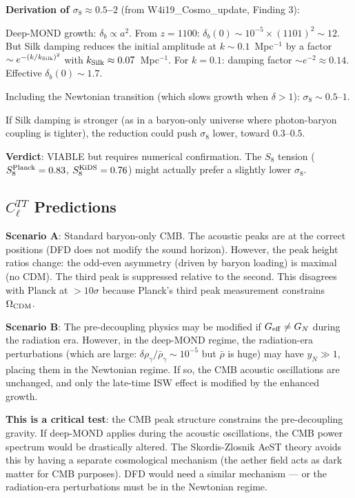 \documentclass[11pt]{article}
\theoremstyle{definition}
\theoremstyle{remark}
\newcommand{\Geff}{G_{\rm eff}}
\begin{document}
\textbf{Derivation of $\sigma_8 \approx 0.5$--$2$} (from
W4i19\_Cosmo\_update, Finding 3):

Deep-MOND growth: $\delta_b \propto a^2$. From $z = 1100$:
$\delta_b(0) \sim 10^{-5} \times (1101)^2 \sim 12$. But Silk
damping reduces the initial amplitude at $k \sim 0.1$~Mpc$^{-1}$
by a factor $\sim e^{-(k/k_{\rm Silk})^2}$ with $k_{\rm Silk}
\approx 0.07$~Mpc$^{-1}$. For $k = 0.1$: damping factor
$\sim e^{-2} \approx 0.14$. Effective $\delta_b(0) \sim 1.7$.

Including the Newtonian transition (which slows growth when
$\delta > 1$): $\sigma_8 \sim 0.5$--$1$.

If Silk damping is stronger (as in a baryon-only universe where
photon-baryon coupling is tighter), the reduction could push
$\sigma_8$ lower, toward $0.3$--$0.5$.

\textbf{Verdict}: VIABLE but requires numerical confirmation.
The $S_8$ tension ($S_8^{\rm Planck} = 0.83$, $S_8^{\rm KiDS}
= 0.76$) might actually prefer a slightly lower $\sigma_8$.

\subsection{$C_\ell^{TT}$ Predictions}

\textbf{Scenario A}: Standard baryon-only CMB. The acoustic peaks
are at the correct positions (DFD does not modify the sound horizon).
However, the peak height ratios change: the odd-even asymmetry
(driven by baryon loading) is maximal (no CDM). The third peak is
suppressed relative to the second. This disagrees with Planck at
$> 10\sigma$ because Planck's third peak measurement constrains
$\Omega_{\rm CDM}$.

\textbf{Scenario B}: The pre-decoupling physics may be modified
if $\Geff \neq G_N$ during the radiation era. However, in the
deep-MOND regime, the radiation-era perturbations (which are large:
$\delta\rho_\gamma/\bar\rho_\gamma \sim 10^{-5}$ but $\bar\rho$
is huge) may have $y_N \gg 1$, placing them in the Newtonian regime.
If so, the CMB acoustic oscillations are unchanged, and only the
late-time ISW effect is modified by the enhanced growth.

\textbf{This is a critical test}: the CMB peak structure constrains
the pre-decoupling gravity. If deep-MOND applies during the acoustic
oscillations, the CMB power spectrum would be drastically altered.
The Skordis-Zlosnik AeST theory avoids this by having a separate
cosmological mechanism (the aether field acts as dark matter for
CMB purposes). DFD would need a similar mechanism --- or the
radiation-era perturbations must be in the Newtonian regime.
\end{document}
